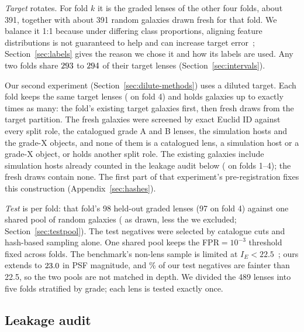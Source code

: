 \emph{Target} rotates. For fold $k$ it is the graded lenses of the other four folds, about 391,
together with about 391 random galaxies drawn fresh for that fold. We balance it 1:1 because
under differing class proportions, aligning feature distributions is not guaranteed to help and
can increase target error~\citep{zhao2019invariant, zhao2020gls, classimbalanceda}; Section~\ref{sec:labels} gives the reason we chose
it and how its labels are used. Any two folds share $293{}$ to
$294{}$ of their target lenses (Section~\ref{sec:intervals}).

Our second experiment (Section~\ref{sec:dilute-methods}) uses a diluted target. Each fold keeps
the same \dlPoolLens{} target lenses (\dlPoolLensFour{} on fold 4) and holds galaxies up to
exactly \dlRatio{} times as many: the fold's existing target galaxies first, then fresh draws
from the target partition. The \dlFresh{} fresh galaxies were screened by exact Euclid ID against
every split role, the catalogued grade A and B lenses, the simulation hosts and the grade-X
objects, and none of them is a catalogued lens, a simulation host or a grade-X object, or holds
another split role. The existing galaxies include simulation hosts
already counted in the leakage audit below (\dlHosts{} on folds 1--4); the fresh draws contain
none. The first part of that experiment's pre-registration fixes this construction
(Appendix~\ref{sec:hashes}).

\emph{Test} is per fold: that fold's 98 held-out graded lenses (97 on fold 4) against one
shared pool of \TestNegDOne{} random galaxies (\TestNegDrawn{} as drawn, less the
\DOneRemoved{} we excluded; Section~\ref{sec:testpool}). The test negatives were selected by
catalogue cuts and hash-based sampling alone. One shared pool keeps the FPR${}=10^{-3}$
threshold fixed across folds. The benchmark's non-lens sample is limited at
$I_E < 22.5$~\citep{lines2025simstosky}; ours extends to $23.0{}$ in PSF magnitude, and
\FracFaintTest{}\% of our test negatives are fainter than 22.5, so the two pools are not
matched in depth. We divided the 489 lenses into five folds stratified by grade; each lens is
tested exactly once.

\subsection{Leakage audit}

